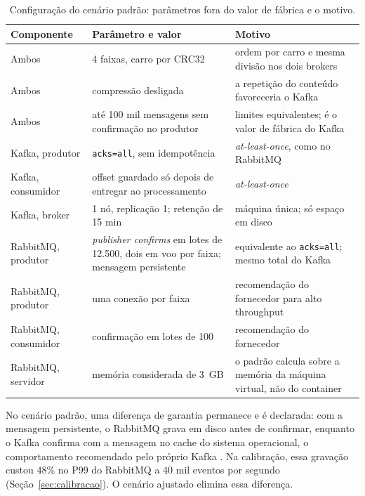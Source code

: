 \documentclass[12pt]{article}
\begin{document}
\begin{table}[ht]
\centering
\caption{Configuração do cenário padrão: parâmetros fora do valor de fábrica e o motivo.}
\label{tab:configuracao}
\small
\begin{tabular}{|p{2.6cm}|p{4.6cm}|p{6.4cm}|}
\hline
\textbf{Componente} & \textbf{Parâmetro e valor} & \textbf{Motivo} \\
\hline
Ambos & 4 faixas, carro por CRC32 & ordem por carro e mesma divisão nos dois brokers \\
\hline
Ambos & compressão desligada & a repetição do conteúdo favoreceria o Kafka \\
\hline
Ambos & até 100 mil mensagens sem confirmação no produtor & limites equivalentes; é o valor de fábrica do Kafka \\
\hline
Kafka, produtor & \texttt{acks=all}, sem idempotência & \textit{at-least-once}, como no RabbitMQ \\
\hline
Kafka, consumidor & offset guardado só depois de entregar ao processamento & \textit{at-least-once} \\
\hline
Kafka, broker & 1 nó, replicação 1; retenção de 15 min & máquina única; só espaço em disco \\
\hline
RabbitMQ, produtor & \textit{publisher confirms} em lotes de 12.500, dois em voo por faixa; mensagem persistente & equivalente ao \texttt{acks=all}; mesmo total do Kafka \\
\hline
RabbitMQ, produtor & uma conexão por faixa & recomendação do fornecedor para alto throughput \\
\hline
RabbitMQ, consumidor & confirmação em lotes de 100 & recomendação do fornecedor \\
\hline
RabbitMQ, servidor & memória considerada de 3~GB & o padrão calcula sobre a memória da máquina virtual, não do container \\
\hline
\end{tabular}
\end{table}

No cenário padrão, uma diferença de garantia permanece e é declarada: com a mensagem
persistente, o RabbitMQ grava em disco antes de confirmar, enquanto o Kafka confirma com
a mensagem no cache do sistema operacional, o comportamento recomendado pelo próprio Kafka
\cite{kafka:docs}. Na calibração, essa gravação custou 48\% no P99 do RabbitMQ a 40 mil
eventos por segundo (Seção~\ref{sec:calibracao}). O cenário ajustado elimina essa
diferença.
\end{document}
